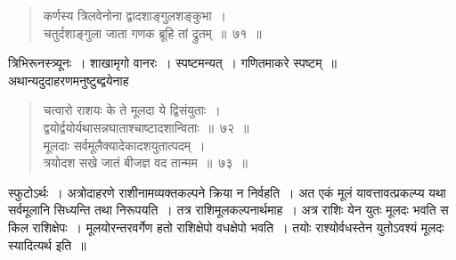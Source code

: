 \documentclass[11pt, openany]{book}
\begin{document}
\newpage
\begin{quote}
    \ex
    कर्णस्य त्रिलवेनोना द्वादशाङ्गुलशङ्कुभा~। \\
 चतुर्दशाङ्गुला जाता गणक ब्रूहि तां द्रुतम्~॥~७१~॥~
\end{quote}
 
त्रिभिरूनस्त्र्यूनः~। शाखामृगो वानरः~। स्पष्टमन्यत्~। गणितमाकरे स्पष्टम्~॥\\

\vspace{-3mm}
 अथान्यदुदाहरणमनुष्टुब्द्वयेनाह\textendash
\begin{quote}
    \ex
     चत्वारो राशयः के ते मूलदा ये द्विसंयुताः~। \\
 द्वयोर्द्वयोर्यथासन्नघाताश्चाष्टादशान्विताः~॥~७२~॥~\\

\vspace{-5mm}
 मूलदाः सर्वमूलैक्यादेकादशयुतात्पदम्~। \\
 त्रयोदश सखे जातं बीजज्ञ वद तान्मम~॥~७३~॥~
\end{quote}

स्फुटोऽर्थः~। अत्रोदाहरणे राशीनामव्यक्तकल्पने क्रिया न निर्वहति~। अत
एकं मूलं यावत्तावत्प्रकल्प्य यथा सर्वमूलानि सिध्यन्ति तथा निरूपयति~। 
तत्र राशिमूलकल्पनार्थमाह~। अत्र राशिः येन युतः मूलदः भवति 
स किल राशिक्षेपः~। मूलयोरन्तरवर्गेण हतो राशिक्षेपो वधक्षेपो भवति~। 
तयोः राश्योर्वधस्तेन युतोऽवश्यं मूलदः स्यादित्यर्थ इति~॥ \\
\end{document}
